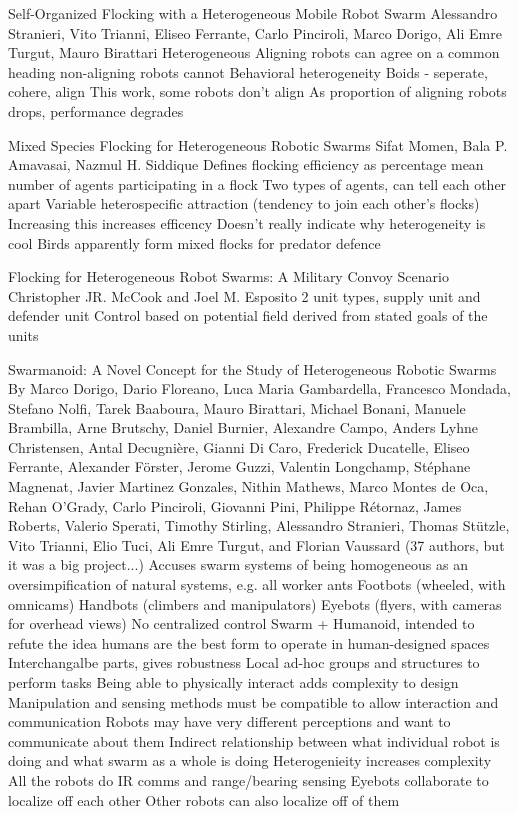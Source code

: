 Self-Organized Flocking with a Heterogeneous Mobile Robot Swarm
Alessandro Stranieri, Vito Trianni, Eliseo Ferrante, Carlo Pinciroli, Marco Dorigo, Ali Emre Turgut, Mauro Birattari
	Heterogeneous
	Aligning robots can agree on a common heading
	non-aligning robots cannot
	Behavioral heterogeneity
	Boids - seperate, cohere, align
		This work, some robots don't align
	As proportion of aligning robots drops, performance degrades

Mixed Species Flocking for Heterogeneous Robotic Swarms
Sifat Momen, Bala P. Amavasai, Nazmul H. Siddique 
	Defines flocking efficiency as percentage mean number of agents participating in a flock
	Two types of agents, can tell each other apart
	Variable heterospecific attraction (tendency to join each other's flocks)
		Increasing this increases efficency
	Doesn't really indicate why heterogeneity is cool
		Birds apparently form mixed flocks for predator defence

Flocking for Heterogeneous Robot Swarms: A Military Convoy Scenario
Christopher JR. McCook and Joel M. Esposito
	2 unit types, supply unit and defender unit
	Control based on potential field derived from stated goals of the units

Swarmanoid: A Novel Concept for the Study of Heterogeneous Robotic Swarms
By Marco Dorigo, Dario Floreano, Luca Maria Gambardella, Francesco Mondada, Stefano Nolfi, Tarek Baaboura, Mauro Birattari, Michael Bonani, Manuele Brambilla, Arne Brutschy, Daniel Burnier, Alexandre Campo, Anders Lyhne Christensen, Antal Decugnière, Gianni Di Caro, Frederick Ducatelle, Eliseo Ferrante, Alexander Förster, Jerome Guzzi, Valentin Longchamp, Stéphane Magnenat, Javier Martinez Gonzales, Nithin Mathews,
Marco Montes de Oca, Rehan O’Grady, Carlo Pinciroli, Giovanni Pini, Philippe Rétornaz, James Roberts, Valerio Sperati, Timothy Stirling, Alessandro Stranieri, Thomas Stützle, Vito Trianni, Elio Tuci, Ali Emre Turgut, and Florian Vaussard
(37 authors, but it was a big project...)
	Accuses swarm systems of being homogeneous as an oversimpification of natural systems, e.g. all worker ants
	Footbots (wheeled, with omnicams)
	Handbots (climbers and manipulators)
	Eyebots (flyers, with cameras for overhead views)
	No centralized control
	Swarm + Humanoid, intended to refute the idea humans are the best form to operate in human-designed spaces
	Interchangalbe parts, gives robustness
	Local ad-hoc groups and structures to perform tasks
	Being able to physically interact adds complexity to design
		Manipulation and sensing methods must be compatible to allow interaction and communication
		Robots may have very different perceptions and want to communicate about them
	Indirect relationship between what individual robot is doing and what swarm as a whole is doing
		Heterogenieity increases complexity
	All the robots do IR comms and range/bearing sensing
	Eyebots collaborate to localize off each other
		Other robots can also localize off of them

